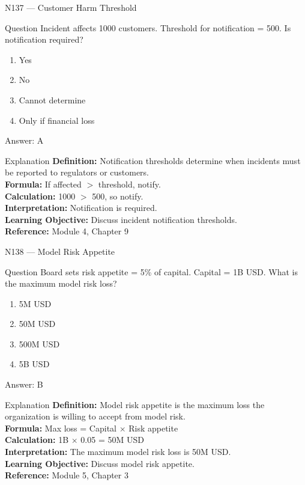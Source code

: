 \documentclass[aspectratio=169,8pt]{beamer}
\begin{document}
	\begin{frame}{N137 --- Customer Harm Threshold}
		\begin{block}{Question}
			Incident affects 1000 customers. Threshold for notification = 500. Is notification required?
			\begin{enumerate}
				\item Yes
				\item No
				\item Cannot determine
				\item Only if financial loss
			\end{enumerate}
		\end{block}
		\begin{exampleblock}{Answer: A}\end{exampleblock}
		\begin{block}{Explanation}
			\textbf{Definition:} Notification thresholds determine when incidents must be reported to regulators or customers.\\
			\textbf{Formula:} If affected $>$ threshold, notify.\\
			\textbf{Calculation:} 1000 $>$ 500, so notify.\\
			\textbf{Interpretation:} Notification is required.\\
			\textbf{Learning Objective:} Discuss incident notification thresholds.\\
			\textbf{Reference:} Module 4, Chapter 9
		\end{block}
	\end{frame}
	
	\begin{frame}{N138 --- Model Risk Appetite}
		\begin{block}{Question}
			Board sets risk appetite = 5\% of capital. Capital = 1B USD. What is the maximum model risk loss?
			\begin{enumerate}
				\item 5M USD
				\item 50M USD
				\item 500M USD
				\item 5B USD
			\end{enumerate}
		\end{block}
		\begin{exampleblock}{Answer: B}\end{exampleblock}
		\begin{block}{Explanation}
			\textbf{Definition:} Model risk appetite is the maximum loss the organization is willing to accept from model risk.\\
			\textbf{Formula:} Max loss = Capital $\times$ Risk appetite\\
			\textbf{Calculation:} 1B $\times$ 0.05 = 50M USD\\
			\textbf{Interpretation:} The maximum model risk loss is 50M USD.\\
			\textbf{Learning Objective:} Discuss model risk appetite.\\
			\textbf{Reference:} Module 5, Chapter 3
		\end{block}
	\end{frame}
	
\end{document}
